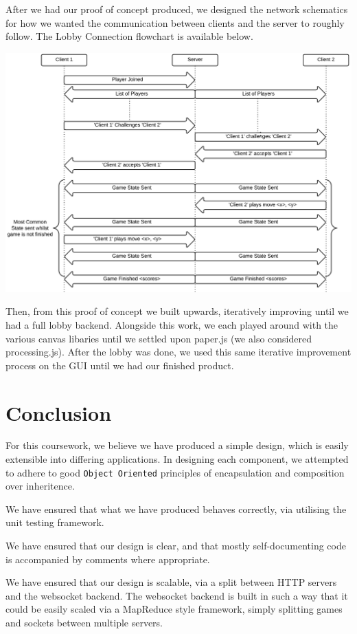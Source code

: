 \documentclass[a4wide, 11pt]{article}
\begin{document}
After we had our proof of concept produced, we designed the network schematics for how we wanted the communication between clients and the server to roughly follow. The Lobby Connection flowchart is available below.

\includegraphics[width=\textwidth]{ConnectionFlowchart.png}


Then, from this proof of concept we built upwards, iteratively improving until we had a full lobby backend. Alongside this work, we each played around with the various canvas libaries until we settled upon paper.js (we also considered processing.js). After the lobby was done, we used this same iterative improvement process on the GUI until we had our finished product.

\section{Conclusion}

For this coursework, we believe we have produced a simple design, which is easily extensible into differing applications. In designing each component, we attempted to adhere to good \texttt{Object Oriented} principles of encapsulation and composition over inheritence.

We have ensured that what we have produced behaves correctly, via utilising the unit testing framework. 

We have ensured that our design is clear, and that mostly self-documenting code is accompanied by comments where appropriate.

We have ensured that our design is scalable, via a split between HTTP servers and the websocket backend. The websocket backend is built in such a way that it could be easily scaled via a MapReduce style framework, simply splitting games and sockets between multiple servers.
\end{document}
